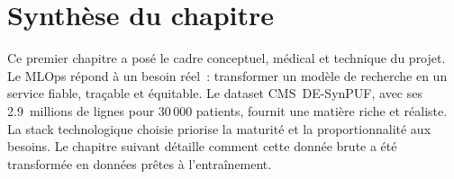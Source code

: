 \section*{Synthèse du chapitre}

Ce premier chapitre a posé le cadre conceptuel, médical et technique du projet.
Le MLOps répond à un besoin réel~: transformer un modèle de recherche en un service
fiable, traçable et équitable. Le dataset CMS~DE-SynPUF, avec ses 2.9~millions
de lignes pour 30\,000 patients, fournit une matière riche et réaliste. La stack
technologique choisie priorise la maturité et la proportionnalité aux besoins.
Le chapitre suivant détaille comment cette donnée brute a été transformée en
données prêtes à l'entraînement.
